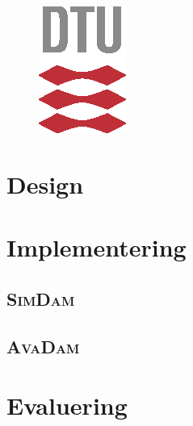 \begin{figure}[H]
    \centering
    \includegraphics{Figurer/DTU3CMYK.eps}
\end{figure}


\newpage

%
%

\tableofcontents

\newpage
{}
\setcounter{page}{1}




\section{Design}





\section{Implementering}


\subsection{\textsc{SimDam}}\label{sec:ImpSimp}




\subsection{\textsc{AvaDam}}\label{sec:ImpAva}





\section{Evaluering}
%




